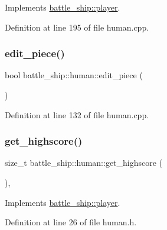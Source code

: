 Implements \hyperlink{classbattle__ship_1_1player_a86be2256620cd5e20da6db7be8afdbc8}{battle\+\_\+ship\+::player}.



Definition at line 195 of file human.\+cpp.

\mbox{\label{classbattle__ship_1_1human_a8f0addc975b597a92d4c82849c2fff5d}} 
\subsubsection{\texorpdfstring{edit\+\_\+piece()}{edit\_piece()}}
{\footnotesize\ttfamily bool battle\+\_\+ship\+::human\+::edit\+\_\+piece (\begin{DoxyParamCaption}{ }\end{DoxyParamCaption})}



Definition at line 132 of file human.\+cpp.

\mbox{\label{classbattle__ship_1_1human_ac3529c252376938ce6b62ac40f8df3b3}} 
\subsubsection{\texorpdfstring{get\+\_\+highscore()}{get\_highscore()}}
{\footnotesize\ttfamily size\+\_\+t battle\+\_\+ship\+::human\+::get\+\_\+highscore (\begin{DoxyParamCaption}{ }\end{DoxyParamCaption})\hspace{0.3cm}{\ttfamily [inline]}, {\ttfamily [virtual]}}



Implements \hyperlink{classbattle__ship_1_1player_a9b74e59f4b120d38ad591dba6a1d1ba7}{battle\+\_\+ship\+::player}.



Definition at line 26 of file human.\+h.

\mbox{\label{classbattle__ship_1_1human_ab6e8f18828d7671bbc7645f38369d370}} 
